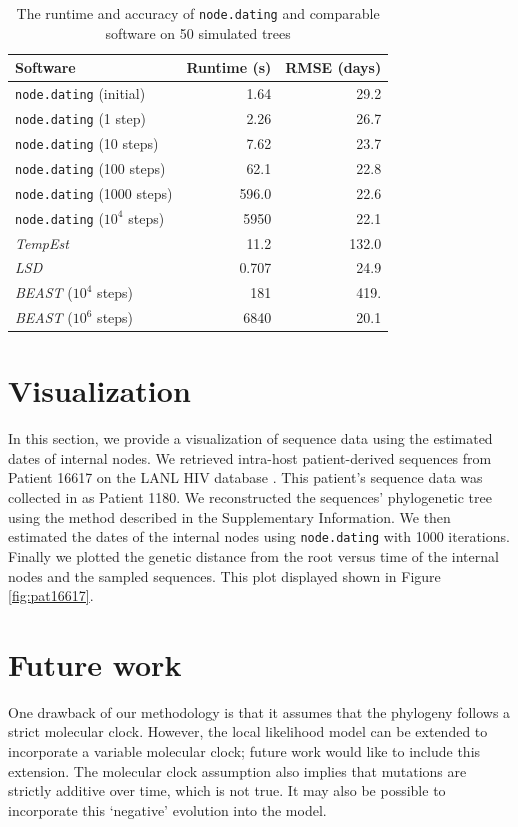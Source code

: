 \documentclass{bioinfo}
\newcommand{\code}[1]{{\tt #1}}
\begin{document}
\begin{table}[t]
	\caption[Runtime and accuracy]{The runtime and accuracy of \code{node.dating} and comparable software on 50 simulated trees}
	\label{tab:runtime}
	\centering
	\begin{tabular}{lrr}
		\hline
		Software & Runtime (s) & RMSE (days) \\
		\hline
		\code{node.dating} (initial) & 1.64 & 29.2 \\
		\code{node.dating} (1 step) & 2.26 & 26.7 \\
		\code{node.dating} (10 steps) & 7.62 & 23.7 \\
		\code{node.dating} (100 steps) & 62.1 & 22.8 \\
		\code{node.dating} (1000 steps) & 596.0 & 22.6 \\
		\code{node.dating} ($10^4$ steps) & 5950 & 22.1 \\
		\emph{TempEst} & 11.2 & 132.0 \\
		\emph{LSD} & 0.707 & 24.9 \\
		\emph{BEAST} ($10^4$ steps) & 181 & 419. \\
		\emph{BEAST} ($10^6$ steps) & 6840 & 20.1 \\
		\hline
	\end{tabular}
\end{table}

\section{Visualization} \label{sec:vis}
In this section, we provide a visualization of sequence data using the estimated dates of internal nodes.
We retrieved intra-host patient-derived sequences from Patient 16617 on the LANL HIV database \citep{LosAlamos}.
This patient's sequence data was collected in \cite{Llewellyn06} as Patient 1180.
We reconstructed the sequences' phylogenetic tree using the method described in the Supplementary Information.
We then estimated the dates of the internal nodes using \code{node.dating} with 1000 iterations. 
Finally we plotted the genetic distance from the root versus time of the internal nodes and the sampled sequences. 
This plot displayed shown in Figure \ref{fig:pat16617}.

\section{Future work} \label{sec:discuss}
One drawback of our methodology is that it assumes that the phylogeny follows a strict molecular clock.
However, the local likelihood model can be extended to incorporate a variable molecular clock; future work would like to include this extension.
The molecular clock assumption also implies that mutations \showthe\parskip are strictly additive over time, which is not true.
It may also be possible to incorporate this `negative' evolution into the model.
\end{document}
